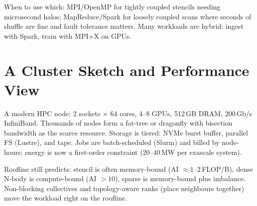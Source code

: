When to use which: MPI/OpenMP for tightly coupled stencils needing microsecond halos; MapReduce/Spark for loosely coupled scans where seconds of shuffle are fine and fault tolerance matters. Many workloads are hybrid: ingest with Spark, train with MPI+X on GPUs.

\section{A Cluster Sketch and Performance View}\label{sec:cluster}
A modern HPC node: 2 sockets $\times$ 64 cores, 4--8 GPUs, 512\,GB DRAM, 200\,Gb/s InfiniBand. Thousands of nodes form a fat-tree or dragonfly with bisection bandwidth as the scarce resource. Storage is tiered: NVMe burst buffer, parallel FS (Lustre), and tape. Jobs are batch-scheduled (Slurm) and billed by node-hours; energy is now a first-order constraint (20--40\,MW per exascale system).

\begin{center}
\end{center}

Roofline still predicts: stencil is often memory-bound (AI $\approx1$--$2$\,FLOP/B), dense N-body is compute-bound (AI $>10$), sparse is memory-bound plus imbalance. Non-blocking collectives and topology-aware ranks (place neighbours together) move the workload right on the roofline.


